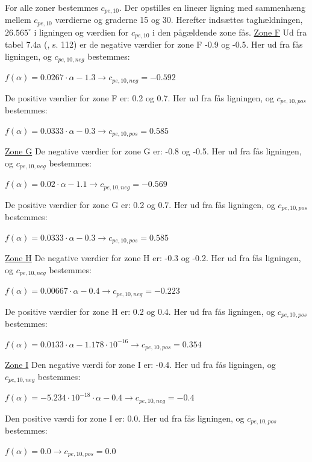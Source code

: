 For alle zoner bestemmes $c_{pe,10}$. Der opstilles en lineær ligning med sammenhæng mellem $c_{pe,10}$ værdierne og graderne 15 og 30. Herefter indsættes taghældningen, $26.565^{\circ}$ i ligningen og værdien for $c_{pe,10}$ i den pågældende zone fås.
\newline
\newline
\underline{Zone F}
\newline
Ud fra tabel 7.4a (\citep{EU91}, s. 112) er de negative værdier for zone F -0.9 og -0.5. Her ud fra fås ligningen, og $c_{pe,10,neg}$ bestemmes:
\begin{center}
	$f(\alpha)=0.0267\cdot \alpha - 1.3 \to c_{pe,10,neg}=-0.592$
\end{center}
De positive værdier for zone F er: 0.2 og 0.7. Her ud fra fås ligningen, og $c_{pe,10,pos}$ bestemmes:
\begin{center}
	$f(\alpha)=0.0333\cdot \alpha - 0.3 \to c_{pe,10,pos}=0.585$
\end{center}

\underline{Zone G}
\newline
De negative værdier for zone G er: -0.8 og -0.5. Her ud fra fås ligningen, og $c_{pe,10,neg}$ bestemmes:
\begin{center}
	$f(\alpha)=0.02\cdot \alpha - 1.1 \to c_{pe,10,neg}=-0.569$
\end{center}
De positive værdier for zone G er: 0.2 og 0.7. Her ud fra fås ligningen, og $c_{pe,10,pos}$ bestemmes:
\begin{center}
	$f(\alpha)=0.0333\cdot \alpha - 0.3 \to c_{pe,10,pos}=0.585$
\end{center}

\underline{Zone H}
\newline
De negative værdier for zone H er: -0.3 og -0.2. Her ud fra fås ligningen, og $c_{pe,10,neg}$ bestemmes:
\begin{center}
	$f(\alpha)=0.00667\cdot \alpha - 0.4 \to c_{pe,10,neg}=-0.223$
\end{center}
De positive værdier for zone H er: 0.2 og 0.4. Her ud fra fås ligningen, og $c_{pe,10,pos}$ bestemmes:
\begin{center}
	$f(\alpha)=0.0133\cdot \alpha - 1.178\cdot 10^{-16} \to c_{pe,10,pos}=0.354$
\end{center}

\underline{Zone I}
\newline
Den negative værdi for zone I er: -0.4. Her ud fra fås ligningen, og $c_{pe,10,neg}$ bestemmes:
\begin{center}
	$f(\alpha)=-5.234\cdot 10^{-18}\cdot \alpha - 0.4 \to c_{pe,10,neg}=-0.4$
\end{center}
Den positive værdi for zone I er: 0.0. Her ud fra fås ligningen, og $c_{pe,10,pos}$ bestemmes:
\begin{center}
	$f(\alpha)=0.0 \to c_{pe,10,pos}=0.0$
\end{center}

